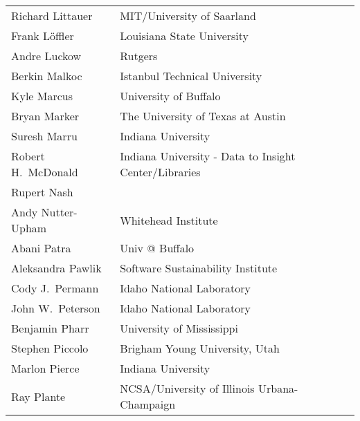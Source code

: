 \documentclass[11pt, oneside]{amsart}
\begin{document}
{\begin{longtable}{ll}
\\ Richard Littauer      &  MIT/University of Saarland                                                           
\\ Frank L\"{o}ffler     &  Louisiana State University                                                           
\\ Andre Luckow          &  Rutgers                                                                              
\\ Berkin Malkoc         &  Istanbul Technical University                                                        
\\ Kyle Marcus           &  University of Buffalo                                                                
\\ Bryan Marker          &  The University of Texas at Austin                                                    
\\ Suresh Marru          &  Indiana University                                                                   
\\ Robert H.~McDonald    &  Indiana University - Data to Insight Center/Libraries                                
\\ Rupert Nash           
\\ Andy Nutter-Upham     &  Whitehead Institute                                                                  
\\ Abani Patra           &  Univ @ Buffalo                                                                       
\\ Aleksandra Pawlik     &  Software Sustainability Institute                                                    
\\ Cody J.~Permann       &  Idaho National Laboratory                                                            
\\ John W.~Peterson      &  Idaho National Laboratory                                                            
\\ Benjamin Pharr        &  University of Mississippi                                                            
\\ Stephen Piccolo       &  Brigham Young University, Utah                                                       
\\ Marlon Pierce         &  Indiana University                                                                   
\\ Ray Plante            &  NCSA/University of Illinois Urbana-Champaign                                         

\end{longtable}}
\end{document}
